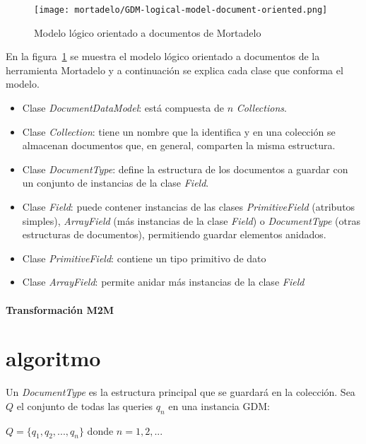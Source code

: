 \begin{figure}[h!t] 
    \centering
    \texttt{[image: mortadelo/GDM-logical-model-document-oriented.png]}
    \caption{Modelo lógico orientado a documentos de Mortadelo}
    \label{img:mortadelo-gdm-logical-model-document-oriented}
\end{figure}


En la figura~\ref{img:mortadelo-gdm-logical-model-document-oriented} se muestra el modelo lógico orientado a documentos de la herramienta Mortadelo y a continuación se explica cada clase que conforma el modelo.


\begin{itemize}
    \item Clase \textit{DocumentDataModel}: está compuesta de $n$ \textit{Collections}.
    \item Clase \textit{Collection}: tiene un nombre que la identifica y en una colección se almacenan documentos que, en general, comparten la misma estructura.
    \item Clase \textit{DocumentType}: define la estructura de los documentos a guardar con un conjunto de instancias de la clase \textit{Field}.
    \item Clase \textit{Field}: puede contener instancias de las clases \textit{PrimitiveField} (atributos simples), \textit{ArrayField} (más instancias de la clase \textit{Field}) o \textit{DocumentType} (otras estructuras de documentos), permitiendo guardar elementos anidados.
    \item Clase \textit{PrimitiveField}: contiene un tipo primitivo de dato
    \item Clase \textit{ArrayField}: permite anidar más instancias de la clase \textit{Field}
\end{itemize}

\paragraph*{Transformación M2M}




\section*{algoritmo}


Un \textit{DocumentType} es la estructura principal que se guardará en la colección.
Sea $Q$ el conjunto de todas las queries $q_{n}$ en una instancia GDM:

\begin{center}
    $Q = \{q_{1}, q_{2},..., q_{n}\}$ donde $n=1,2,...$    
\end{center}

